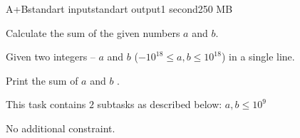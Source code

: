 \begin{problem}{A+B}{standart input}{standart output}{1 second}{250 MB}

Calculate the sum of the given numbers $a$ and $b$.

\InputFile
Given two integers –  $a$ and $b$ ($-10^{18} \leq a,b \leq 10^{18}$) in a single line.

\OutputFile
Print the sum of $a$ and $b$ .

\Scoring
This task contains $2$ subtasks as described below:
 $a,b \leq 10^9$
 
 No additional constraint.
 
 

\Examples

\begin{example}
%
%
\end{example}

\end{problem}
